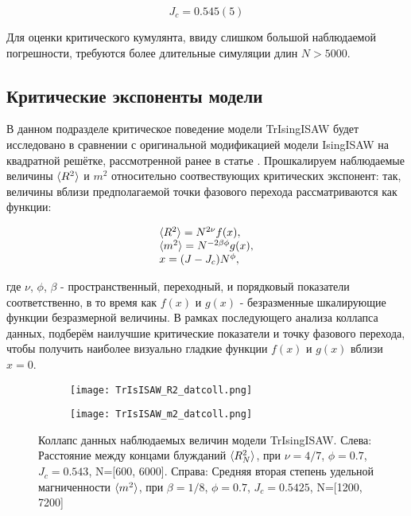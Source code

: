 \begin{equation}
\label{eq:TrIsISAW_Jc}
	J_c = 0.545(5)
\end{equation}

Для оценки критического кумулянта, ввиду слишком большой наблюдаемой погрешности, требуются более длительные симуляции длин $N > 5000$.


\newpage

\subsection{Критические экспоненты модели}

В данном подразделе критическое поведение модели TrIsingISAW будет исследовано в сравнении с оригинальной модификацией модели IsingISAW на квадратной решётке, рассмотренной ранее в статье \cite{faizullina2021critical}.
Прошкалируем наблюдаемые величины $\langle R^2 \rangle$ и $m^2$ относительно соотвествующих критических экспонент:
так, величины вблизи предполагаемой точки фазового перехода рассматриваются как функции:

\begin{equation}
\begin{array}{l}
\label{eq:TrIsISAW_datcoll}
\langle R^2 \rangle = N^{2\nu} f(x), \\
\langle m^2 \rangle = N^{-2\beta\phi} g(x), \\
x = (J-J_c) N^{\phi},
\end{array}
\end{equation}

где $\nu$, $\phi$, $\beta$  - пространственный, переходный, и порядковый показатели соответственно, в то время как $f(x)$ и $g(x)$ - безразменные шкалирующие функции безразмерной величины.
В рамках последующего анализа коллапса данных, подберём наилучшие критические показатели и точку фазового перехода, 
чтобы получить наиболее визуально гладкие функции $f(x)$ и $g(x)$ вблизи $x=0$.


\begin{figure}[h]
\begin{subfigure}{0.49\textwidth}
\texttt{[image: TrIsISAW\_R2\_datcoll.png]}
\caption{}
\label{fig:TrIsISAW_R2_datcoll}
\end{subfigure}
\hfill
\begin{subfigure}{0.49\textwidth}
\texttt{[image: TrIsISAW\_m2\_datcoll.png]}
\caption{}
\label{fig:TrIsISAW_m2_datcoll}
\end{subfigure}
\caption{Коллапс данных наблюдаемых величин модели TrIsingISAW.
Слева: Расстояние между концами блужданий $\langle R^2_N \rangle$, при $\nu = 4/7$, $\phi=0.7$, $J_c = 0.543$, N=[600, 6000].
Справа: Средняя вторая степень удельной магниченности $\langle m^2 \rangle$, при $\beta = 1/8$, $\phi=0.7$, $J_c = 0.5425$, N=[1200, 7200]}
\end{figure}

